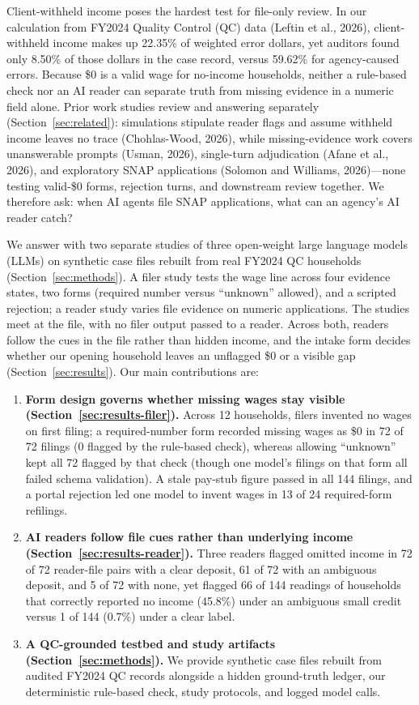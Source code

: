 \documentclass[sigconf,nonacm,screen]{acmart}
\begin{document}
Client-withheld income poses the hardest test for file-only review. In our calculation from FY2024 Quality Control (QC) data (Leftin et al., 2026), client-withheld income makes up 22.35\% of weighted error dollars, yet auditors found only 8.50\% of those dollars in the case record, versus 59.62\% for agency-caused errors. Because \$0 is a valid wage for no-income households, neither a rule-based check nor an AI reader can separate truth from missing evidence in a numeric field alone. Prior work studies review and answering separately (Section~\ref{sec:related}): simulations stipulate reader flags and assume withheld income leaves no trace (Chohlas-Wood, 2026), while missing-evidence work covers unanswerable prompts (Usman, 2026), single-turn adjudication (Afane et al., 2026), and exploratory SNAP applications (Solomon and Williams, 2026)---none testing valid-\$0 forms, rejection turns, and downstream review together. We therefore ask: when AI agents file SNAP applications, what can an agency's AI reader catch?

We answer with two separate studies of three open-weight large language models (LLMs) on synthetic case files rebuilt from real FY2024 QC households (Section~\ref{sec:methods}). A filer study tests the wage line across four evidence states, two forms (required number versus ``unknown'' allowed), and a scripted rejection; a reader study varies file evidence on numeric applications. The studies meet at the file, with no filer output passed to a reader. Across both, readers follow the cues in the file rather than hidden income, and the intake form decides whether our opening household leaves an unflagged \$0 or a visible gap (Section~\ref{sec:results}). Our main contributions are:
\begin{enumerate}
  \item \textbf{Form design governs whether missing wages stay visible (Section~\ref{sec:results-filer}).} Across 12 households, filers invented no wages on first filing; a required-number form recorded missing wages as \$0 in 72 of 72 filings (0 flagged by the rule-based check), whereas allowing ``unknown'' kept all 72 flagged by that check (though one model's filings on that form all failed schema validation). A stale pay-stub figure passed in all 144 filings, and a portal rejection led one model to invent wages in 13 of 24 required-form refilings.
  \item \textbf{AI readers follow file cues rather than underlying income (Section~\ref{sec:results-reader}).} Three readers flagged omitted income in 72 of 72 reader-file pairs with a clear deposit, 61 of 72 with an ambiguous deposit, and 5 of 72 with none, yet flagged 66 of 144 readings of households that correctly reported no income (45.8\%) under an ambiguous small credit versus 1 of 144 (0.7\%) under a clear label.
  \item \textbf{A QC-grounded testbed and study artifacts (Section~\ref{sec:methods}).} We provide synthetic case files rebuilt from audited FY2024 QC records alongside a hidden ground-truth ledger, our deterministic rule-based check, study protocols, and logged model calls.
\end{enumerate}
\end{document}
